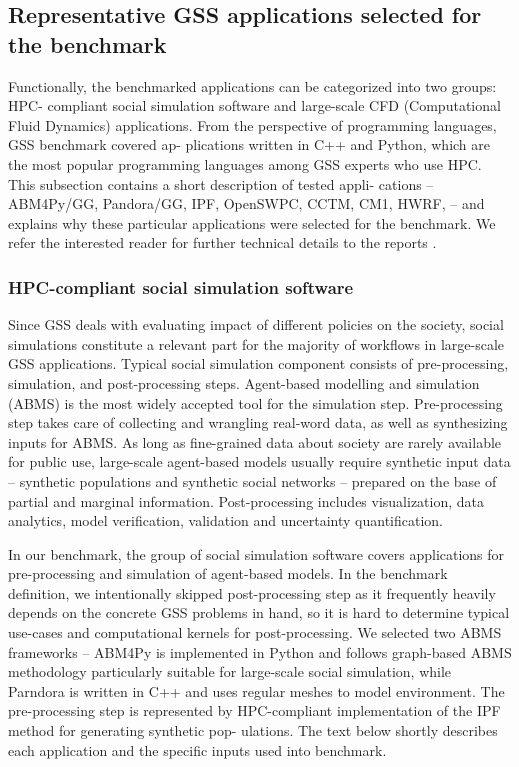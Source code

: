 \subsection{Representative GSS applications selected for the benchmark}

Functionally, the benchmarked applications can be categorized into two groups: HPC-
compliant social simulation software and large-scale CFD (Computational Fluid Dynamics)
applications. From the perspective of programming languages, GSS benchmark covered ap-
plications written in C++ and Python, which are the most popular programming languages
among GSS experts who use HPC. This subsection contains a short description of tested appli-
cations -- ABM4Py/GG, Pandora/GG, IPF, OpenSWPC, CCTM, CM1, HWRF, -- and explains why
these particular applications were selected for the benchmark.
We refer the interested reader for further technical details to the reports \cite{2017:coegss_benchmark1,2018:coegss_benchmark2}.

\subsubsection{HPC-compliant social simulation software}

Since GSS deals with evaluating impact of different policies on the society, social simulations
constitute a relevant part for the majority of workflows in large-scale GSS applications. Typical
social simulation component consists of pre-processing, simulation, and post-processing steps.
Agent-based modelling and simulation (ABMS) is the most widely accepted tool for the simulation step.
Pre-processing step takes care of collecting and wrangling real-word data, as well as
synthesizing inputs for ABMS. As long as fine-grained data about society are rarely available
for public use, large-scale agent-based models usually require synthetic input data -- synthetic
populations and synthetic social networks -- prepared on the base of partial and marginal information.
Post-processing includes visualization, data analytics, model verification, validation
and uncertainty quantification.

In our benchmark, the group of social simulation software covers applications for pre-processing
and simulation of agent-based models. In the benchmark definition, we intentionally
skipped post-processing step as it frequently heavily depends on the concrete GSS problems in
hand, so it is hard to determine typical use-cases and computational kernels for post-processing.
We selected two ABMS frameworks -- \textsf{ABM4Py} is implemented in Python and follows
graph-based ABMS methodology particularly suitable for large-scale social simulation, while \textsf{Parndora}
is written in C++ and uses regular meshes to model environment. The pre-processing step is
represented by HPC-compliant implementation of the IPF method for generating synthetic pop-
ulations. The text below shortly describes each application and the specific inputs used into
benchmark.

